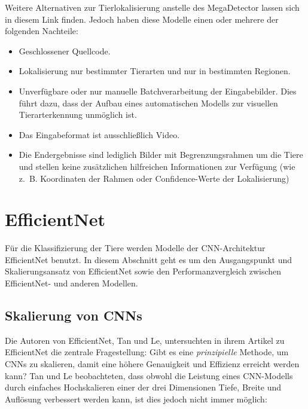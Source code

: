 Weitere Alternativen zur Tierlokalisierung anstelle des MegaDetector lassen sich in diesem Link finden. Jedoch haben diese Modelle einen oder mehrere der folgenden Nachteile:

\begin{itemize}
	\item Geschlossener Quellcode.
	
	\item Lokalisierung nur bestimmter Tierarten und nur in bestimmten Regionen.
	
	\item Unverfügbare oder nur manuelle Batchverarbeitung der Eingabebilder. Dies führt dazu, dass der Aufbau eines automatischen Modells zur visuellen Tierarterkennung unmöglich ist.
	
	\item Das Eingabeformat ist ausschließlich Video.
	
	\item Die Endergebnisse sind lediglich Bilder mit Begrenzungsrahmen um die Tiere und stellen keine zusätzlichen hilfreichen Informationen zur Verfügung (wie z.~B. Koordinaten der Rahmen oder Confidence-Werte der Lokalisierung)
\end{itemize}

\section{EfficientNet} \label{sec:efficientnet}

Für die Klassifizierung der Tiere werden Modelle der CNN-Architektur EfficientNet benutzt. In diesem Abschnitt geht es um den Ausgangspunkt und Skalierungsansatz von EfficientNet sowie den Performanzvergleich zwischen EfficientNet- und anderen Modellen.

\subsection{Skalierung von CNNs}

Die Autoren von EfficientNet, Tan und Le, untersuchten in ihrem Artikel zu EfficientNet die zentrale Fragestellung: Gibt es eine \textit{prinzipielle} Methode, um CNNs zu skalieren, damit eine höhere Genauigkeit und Effizienz erreicht werden kann? Tan und Le beobachteten, dass obwohl die Leistung eines CNN-Modells durch einfaches Hochskalieren einer der drei Dimensionen Tiefe, Breite und Auflösung verbessert werden kann, ist dies jedoch nicht immer möglich:

